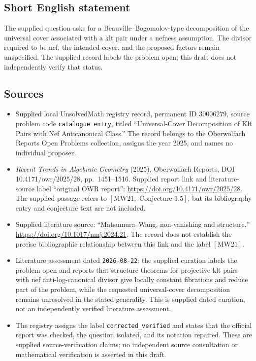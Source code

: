 \documentclass[11pt]{article}
\begin{document}
\subsection{Short English statement}
The supplied question asks for a Beauville--Bogomolov-type decomposition of the universal cover associated with a klt pair under a nefness assumption. The divisor required to be nef, the intended cover, and the proposed factors remain unspecified. The supplied record labels the problem open; this draft does not independently verify that status.
\subsection{Sources}
\begin{itemize}
\item Supplied local UnsolvedMath registry record, permanent ID \(30006279\), source problem code \texttt{catalogue entry}, titled ``Universal-Cover Decomposition of Klt Pairs with Nef Anticanonical Class.'' The record belongs to the Oberwolfach Reports Open Problems collection, assigns the year 2025, and names no individual proposer.
\item \emph{Recent Trends in Algebraic Geometry} (2025), Oberwolfach Reports, DOI 10.4171/owr/2025/28, pp.\ 1451--1516. Supplied report link and literature-source label ``original OWR report'': \url{https://doi.org/10.4171/owr/2025/28}. The supplied passage refers to \([\mathrm{MW21},\text{ Conjecture }1.5]\), but its bibliography entry and conjecture text are not included.
\item Supplied literature source: ``Matsumura--Wang, non-vanishing and structure,'' \url{https://doi.org/10.1017/nmj.2024.21}. The record does not establish the precise bibliographic relationship between this link and the label \([\mathrm{MW21}]\).
\item Literature assessment dated \texttt{2026-08-22}: the supplied curation labels the problem open and reports that structure theorems for projective klt pairs with nef anti-log-canonical divisor give locally constant fibrations and reduce part of the problem, while the requested universal-cover decomposition remains unresolved in the stated generality. This is supplied dated curation, not an independently verified literature assessment.
\item The registry assigns the label \texttt{corrected\_verified} and states that the official report was checked, the question isolated, and its notation repaired. These are supplied source-verification claims; no independent source consultation or mathematical verification is asserted in this draft.
\end{itemize}
\end{document}
